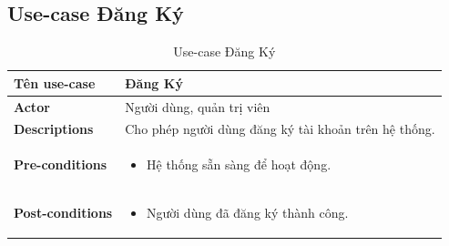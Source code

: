 \subsection{Use-case Đăng Ký}
    \begin{longtable}[H]{|l|p{}|}
        \caption{Use-case Đăng Ký}
        \\ \hline
        \textbf{Tên use-case} & Đăng Ký \\
        \hline
        \textbf{Actor} & Người dùng, quản trị viên \\
        \hline
        \textbf{Descriptions} & Cho phép người dùng đăng ký tài khoản trên hệ thống. \\
        \hline
        \textbf{Pre-conditions} & \vspace{-1cm} \begin{itemize}[leftmargin=4mm]
            \setlength\itemsep{0em}
            \item Hệ thống sẵn sàng để hoạt động.
        \end{itemize} \\
            
        \hline
    
        \textbf{Post-conditions} & \vspace{-1cm}  \begin{itemize} [leftmargin=4mm]
            \setlength\itemsep{0em}
            \item Người dùng đã đăng ký thành công.
        \end{itemize} \\
                
        \hline
            

\end{longtable}
